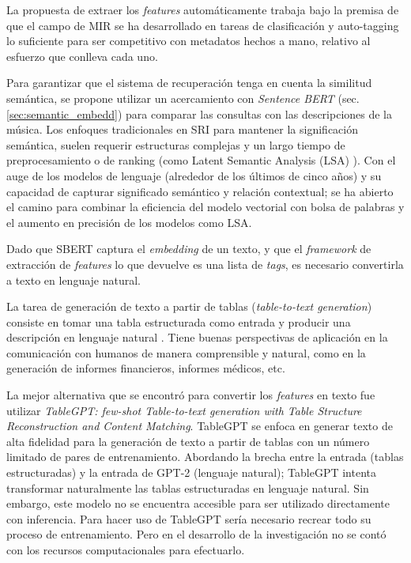 La propuesta de extraer los \textit{features} automáticamente trabaja bajo la premisa de que el campo de MIR se ha desarrollado en tareas de clasificación y auto-tagging lo suficiente para ser competitivo con metadatos hechos a mano, relativo al esfuerzo que conlleva cada uno. %

Para garantizar que el sistema de recuperación tenga en cuenta la similitud semántica, se propone utilizar un acercamiento con \textit{Sentence BERT} (sec. \ref{sec:semantic_embedd}) para comparar las consultas con las descripciones de la música. Los enfoques tradicionales en SRI para mantener la significación semántica, suelen requerir estructuras complejas y un largo tiempo de preprocesamiento o de ranking (como Latent Semantic Analysis (LSA) \cite{Foltz1996LatentSA}). Con el auge de los modelos de lenguaje (alrededor de los últimos de cinco años) y su capacidad de capturar significado semántico y relación contextual; se ha abierto el camino para combinar la eficiencia del modelo vectorial con bolsa de palabras y el aumento en precisión de los modelos como LSA. 

Dado que SBERT captura el \textit{embedding} de un texto, y que el \textit{framework} de extracción de \textit{features} lo que devuelve es una lista de \textit{tags}, es necesario convertirla a texto en lenguaje natural.  

La tarea de generación de texto a partir de tablas (\textit{table-to-text generation}) consiste en tomar una tabla estructurada como entrada y producir una descripción en lenguaje natural \cite{Yang2021TableTT}. Tiene buenas perspectivas de aplicación en la comunicación con humanos de manera comprensible y natural, como en la generación de informes financieros, informes médicos, etc. 

La mejor alternativa que se encontró para convertir los \textit{features} en texto fue utilizar \textit{TableGPT: few-shot Table-to-text generation with Table Structure Reconstruction and Content Matching}. TableGPT \cite{Gong2020TableGPTFT} se enfoca en generar texto de alta fidelidad para la generación de texto a partir de tablas con un número limitado de pares de entrenamiento. Abordando la brecha entre la entrada (tablas estructuradas) y la entrada de GPT-2 (lenguaje natural); TableGPT intenta transformar naturalmente las tablas estructuradas en lenguaje natural. Sin embargo, este modelo no se encuentra accesible para ser utilizado directamente con inferencia. Para hacer uso de TableGPT sería necesario recrear todo su proceso de entrenamiento. Pero en el desarrollo de la investigación no se contó con los recursos computacionales para efectuarlo.

